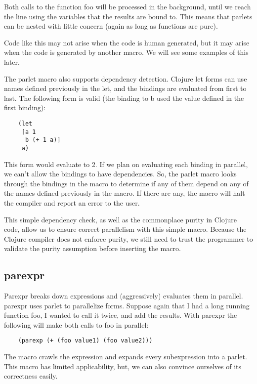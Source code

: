 \documentclass{article}
\begin{document}
Both calls to the function foo will be processed in the background, until we reach the line using the variables that the results are bound to.
This means that parlets can be nested with little concern (again as long as functions are pure).

Code like this may not arise when the code is human generated, but it may arise when the code is generated by another macro.
We will see some examples of this later.

The parlet macro also supports dependency detection.
Clojure let forms can use names defined previously in the let, and the bindings are evaluated from first to last.
The following form is valid (the binding to b used the value defined in the first binding):

\begin{verbatim}
    (let
     [a 1
      b (+ 1 a)]
     a)
\end{verbatim}

This form would evaluate to 2.
If we plan on evaluating each binding in parallel, we can't allow the bindings to have dependencies.
So, the parlet macro looks through the bindings in the macro to determine if any of them depend on
any of the names defined previously in the macro.
If there are any, the macro will halt the compiler and report an error to the user.

This simple dependency check, as well as the commonplace purity in Clojure code, allow us to ensure correct parallelism with this simple macro.
Because the Clojure compiler does not enforce purity, we still need to trust the programmer to validate the purity assumption before inserting the macro.

\subsection{parexpr}

Parexpr breaks down expressions and (aggressively) evaluates them in parallel.
parexpr uses parlet to parallelize forms.
Suppose again that I had a long running function foo, I wanted to call it twice, and add the results.
With parexpr the following will make both calls to foo in parallel:

\begin{verbatim}
    (parexp (+ (foo value1) (foo value2)))
\end{verbatim}

The macro crawls the expression and expands every subexpression into a parlet.
This macro has limited applicability, but, we can also convince ourselves of its correctness easily.
\end{document}
